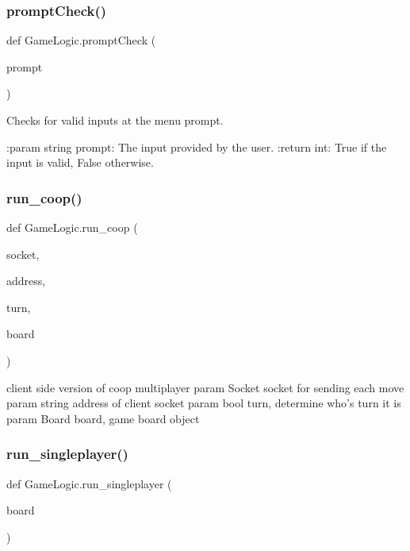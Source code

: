 \subsubsection{\texorpdfstring{prompt\+Check()}{promptCheck()}}
{\footnotesize\ttfamily def Game\+Logic.\+prompt\+Check (\begin{DoxyParamCaption}\item[{}]{prompt }\end{DoxyParamCaption})}

\begin{DoxyVerb}Checks for valid inputs at the menu prompt.

:param string prompt: The input provided by the user.
:return int: True if the input is valid, False otherwise.
\end{DoxyVerb}
 \mbox{\label{namespace_game_logic_afc48c64dfaba7c18f642ab23e8e3a3bf}} 
\subsubsection{\texorpdfstring{run\+\_\+coop()}{run\_coop()}}
{\footnotesize\ttfamily def Game\+Logic.\+run\+\_\+coop (\begin{DoxyParamCaption}\item[{}]{socket,  }\item[{}]{address,  }\item[{}]{turn,  }\item[{}]{board }\end{DoxyParamCaption})}

\begin{DoxyVerb}client side version of coop multiplayer
param Socket socket for sending each move
param string address of client socket
param bool turn, determine who's turn it is
param Board board, game board object
\end{DoxyVerb}
 \mbox{\label{namespace_game_logic_aa19068ecba13ba5dae3258c28138983d}} 
\subsubsection{\texorpdfstring{run\+\_\+singleplayer()}{run\_singleplayer()}}
{\footnotesize\ttfamily def Game\+Logic.\+run\+\_\+singleplayer (\begin{DoxyParamCaption}\item[{}]{board }\end{DoxyParamCaption})}

